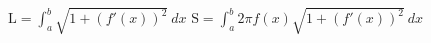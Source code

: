 \documentclass[12pt]{article}
\begin{document}
$\text{L} = \displaystyle{\int_a^b}\sqrt{1+(f'(x))^2} \: dx$ \hspace{.3in} $\text{S} = \displaystyle{\int_a^b}2 \pi f(x)\sqrt{1+(f'(x))^2} \: dx$

%
%
\end{document}
